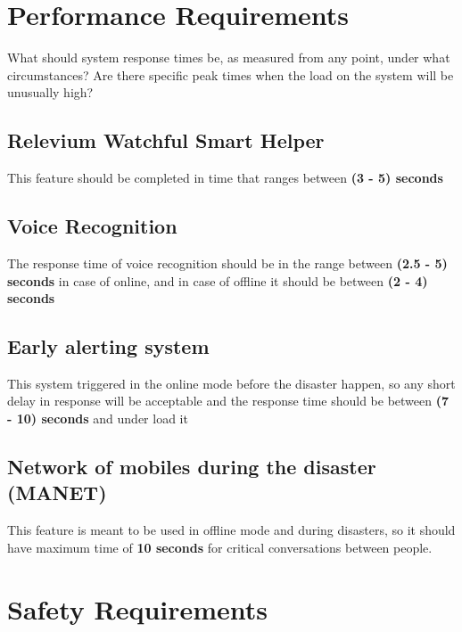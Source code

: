 \documentclass{scrreprt}
\begin{document}
\section{Performance Requirements}
What should system response times be, as measured from any point, under what circumstances?
Are there specific peak times when the load on the system will be unusually high?

\subsection{Relevium Watchful Smart Helper}
This feature should be completed in time that ranges between \textbf{(3 - 5) seconds}


\subsection{Voice Recognition}
The response time of voice recognition should be in the range between \textbf{(2.5 - 5) seconds} in case of online, and in case of offline it should be between \textbf{(2 - 4) seconds}

\subsection{Early alerting system}
This system triggered in the online mode before the disaster happen, so any short delay in response will
be acceptable and the response time should be between \textbf{(7 - 10) seconds} and under load it 

\subsection{Network of mobiles during the disaster (MANET)}
This feature is meant to be used in offline mode and during disasters, so it should have maximum time of \textbf{10 seconds} for critical conversations between people.


\section{Safety Requirements}
\end{document}
